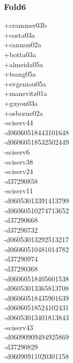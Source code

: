 \begin{multicols}{3}
\subsubsection*{Fold6}
+crammer03b\\
+costa03a\\
+cannon02a\\
+botta03a\\
+almeida05a\\
+tsang05a\\
+evgeniou05a\\
+manevitz01a\\
+guyon03a\\
+osborne02a\\
-sciserv44\\
-d06060518443101648\\
-d06060518532502449\\
-sciserv6\\
-sciserv38\\
-sciserv24\\
-d37290858\\
-sciserv11\\
-d06053013391413799\\
-d06060510274713652\\
-d37290668\\
-d37290732\\
-d06053013292513217\\
-d06060510481014782\\
-d37290974\\
-d37290368\\
-d06060518405601538\\
-d06053013365813708\\
-d06060518435901639\\
-d06060518524102431\\
-d06053013401813843\\
-sciserv43\\
-d06090909494925869\\
-d37290829\\
-d06090911020301158\\

\end{multicols}
